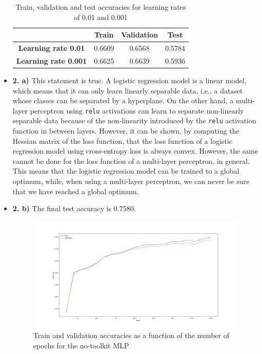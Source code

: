 \documentclass[12pt]{article}
\begin{document}
\begin{itemize}
        \begin{table}[H]
            \centering
            \begin{tabular}{|c|c|c|c|}
                \toprule
                & \textbf{Train} & \textbf{Validation} & \textbf{Test} \\
                \midrule
                \textbf{Learning rate 0.01}  & 0.6609         & 0.6568              & 0.5784        \\
                \textbf{Learning rate 0.001} & 0.6625         & 0.6639              & 0.5936        \\
                \bottomrule
            \end{tabular}
            \label{tab:1.1b}
            \caption{Train, validation and test accuracies for learning rates of 0.01 and 0.001}
        \end{table}

    \item \textbf{2. a)} This statement is true. A logistic regression model is a linear model, which means that it can only learn linearly separable data, i.e., a dataset whose classes can be separated by a hyperplane. On the other hand, a multi-layer perceptron using \texttt{relu} activations can learn to separate non-linearly separable data because of the non-linearity introduced by the \texttt{relu} activation function in between layers. However, it can be shown, by computing the Hessian matrix of the loss function, that the loss function of a logistic regression model using cross-entropy loss is always convex. However, the same cannot be done for the loss function of a multi-layer perceptron, in general. This means that the logistic regression model can be trained to a global optimum, while, when using a multi-layer perceptron, we can never be sure that we have reached a global optimum.

    \item \textbf{2. b)} The final test accuracy is 0.7580.
        \begin{figure}[H]
            \centering
            \includegraphics[width=1\linewidth]{../outputs/hw1-q1-2b.001-acc.png}
            \caption{Train and validation accuracies as a function of the number of epochs for the no-toolkit MLP}
            \label{fig:1.2b:acc}
        \end{figure}


\end{itemize}
\end{document}
